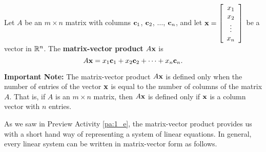 \begin{definition} Let $A$ be an $m \times n$ matrix with columns $\mathbf{c}_1$, $\mathbf{c}_2$, $\ldots$, $\mathbf{c}_n$, and let $\mathbf{x} = \left[ \begin{array}{c} x_1 \\ x_2 \\ \vdots \\ x_n \end{array} \right]$ be a vector in $\mathbb{R}^n$. The \textbf{matrix-vector product} $A\mathbf{x}$ is
\[A \mathbf{x} = x_1 \mathbf{c}_1 + x_2 \mathbf{c}_2 + \cdots + x_n \mathbf{c}_n.\]
\end{definition}



\noindent \textbf{Important Note:} The matrix-vector product $A \mathbf{x}$ is defined only when the number of entries of the vector $\mathbf{x}$ is equal to the number of columns of the matrix $A$. That is, if $A$ is an $m \times n$ matrix, then $A\mathbf{x}$ is defined only if $\mathbf{x}$ is a column vector with $n$ entries. 


\label{sec:mv_form}

As we saw in Preview Activity \ref{pa:1_e}, the matrix-vector product provides us with a short hand way of representing a system of linear equations. In general, every linear system can be written in matrix-vector form as follows.

